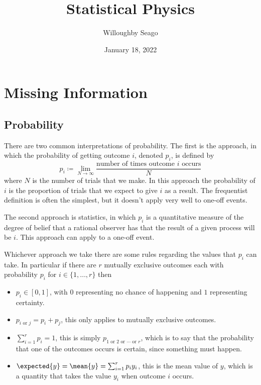 \documentclass[fleqn]{NotesClass}
\title{Statistical Physics}
\author{Willoughby Seago}
\date{January 18, 2022}
\begin{document}
    \frontmatter
    \titlepage
    \tableofcontents
    \listoffigures
    \mainmatter
    
    \chapter{Missing Information}
    \section{Probability}
    There are two common interpretations of probability.
    The first is the  approach, in which the probability of getting outcome \(i\), denoted \(p_i\), is defined by
    \begin{equation}
        p_i \coloneqq \lim_{N \to \infty} \frac{\text{number of times outcome \(i\) occurs}}{N}
    \end{equation}
    where \(N\) is the number of trials that we make.
    In this approach the probability of \(i\) is the proportion of trials that we expect to give \(i\) as a result.
    The frequentist definition is often the simplest, but it doesn't apply very well to one-off events.
    
    The second approach is  statistics, in which \(p_i\) is a quantitative measure of the degree of belief that a rational observer has that the result of a given process will be \(i\).
    This approach can apply to a one-off event.
    
    Whichever approach we take there are some rules regarding the values that \(p_i\) can take.
    In particular if there are \(r\) mutually exclusive outcomes each with probability \(p_i\) for \(i \in \{1, \dotsc, r\}\) then
    \begin{itemize}
        \item \(p_i \in [0, 1]\), with \(0\) representing no chance of happening and \(1\) representing certainty.
        \item \(p_{i\text{ or } j} = p_i + p_j\), this only applies to mutually exclusive outcomes.
        \item \(\sum_{i=1}^{r} p_i = 1\), this is simply \(p_{1 \text{ or } 2 \text{ or } \dotsb \text{ or } r}\), which is to say that the probability that one of the outcomes occurs is certain, since something must happen.
        \item \(\expected{y} = \mean{y} = \sum_{i=1}^{r} p_iy_i\), this is the mean value of \(y\), which is a quantity that takes the value \(y_i\) when outcome \(i\) occurs.
    \end{itemize}
    
\end{document}

